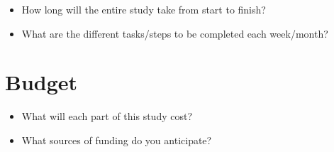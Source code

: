 \documentclass[12pt]{article}
\begin{document}
\begin{itemize}
\item How long will the entire study take from start to finish?
\item What are the different tasks/steps to be completed each week/month?
\end{itemize}

\section{Budget}

\begin{itemize}
\item What will each part of this study cost?
\item What sources of funding do you anticipate?
\end{itemize}

\singlespacing



\end{document}
